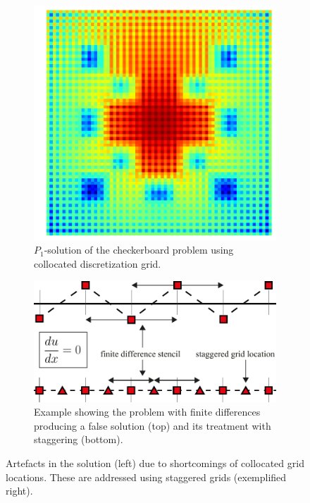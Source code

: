 \begin{figure}[h]
\centering
\begin{subfigure}[t]{0.49\columnwidth}
\centering
\includegraphics[width=\columnwidth]{04_pn_method/results/checkerboard2d_p1_collocated.png}
\caption{$P_1$-solution of the checkerboard problem using collocated discretization grid.}
\label{fig:pn_collocated_grid_artefacts}
\end{subfigure}%
\hspace{0.01\columnwidth}
\begin{subfigure}[t]{0.49\columnwidth}
\centering
\includegraphics[width=\columnwidth]{04_pn_method/figures/fig_staggered_grid_1d_example.pdf}
\caption{Example showing the problem with finite differences producing a false solution (top) and its treatment with staggering (bottom).}
\label{fig:pn_staggered_grid_idea}
\end{subfigure}%
\caption{Artefacts in the solution (left) due to shortcomings of collocated grid locations. These are addressed using staggered grids (exemplified right).}
\label{fig:pn_staggered_grid_problems}
\end{figure}

